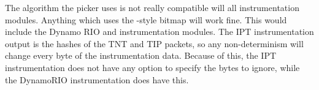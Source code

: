 
The algorithm the picker uses is not really compatible will all instrumentation
modules. Anything which uses the \AFL{}-style bitmap will work fine.  This
would include the Dynamo RIO and \AFL{} instrumentation modules. The IPT
instrumentation output is the hashes of the TNT and TIP packets, so any
non-determinism will change every byte of the instrumentation data.  Because of
this, the IPT instrumentation does not have any option to specify the bytes to
ignore, while the DynamoRIO instrumentation does have this.
